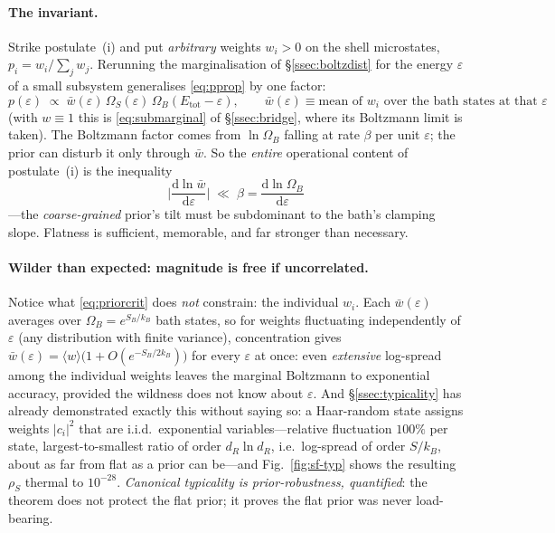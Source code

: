 \documentclass[11pt,a4paper]{article}
\theoremstyle{definition}
\newcommand{\dd}{\mathrm{d}}
\begin{document}
\paragraph{The invariant.} Strike postulate~(i) and put \emph{arbitrary}
weights $w_i>0$ on the shell microstates, $p_i=w_i/\sum_j w_j$. Rerunning the
marginalisation of \S\ref{ssec:boltzdist} for the energy $\varepsilon$ of a
small subsystem generalises \eqref{eq:pprop} by one factor:
\begin{equation}\label{eq:priorclass}
p(\varepsilon)\;\propto\;\bar w(\varepsilon)\,
\Omega_S(\varepsilon)\,\Omega_B(E_{\mathrm{tot}}-\varepsilon),
\qquad
\bar w(\varepsilon)\equiv
\text{mean of }w_i\text{ over the bath states at that }\varepsilon
\end{equation}
(with $w\equiv1$ this is \eqref{eq:submarginal} of \S\ref{ssec:bridge}, where
its Boltzmann limit is taken). The Boltzmann factor comes from
$\ln\Omega_B$ falling at rate $\beta$ per unit $\varepsilon$; the prior can
disturb it only through $\bar w$. So the \emph{entire} operational content of
postulate~(i) is the inequality
\begin{equation}\label{eq:priorcrit}
\boxed{\;\Big|\frac{\dd\ln\bar w}{\dd\varepsilon}\Big|\;\ll\;\beta
=\frac{\dd\ln\Omega_B}{\dd\varepsilon}\;}
\end{equation}
---the \emph{coarse-grained} prior's tilt must be subdominant to the bath's
clamping slope. Flatness is sufficient, memorable, and far stronger than
necessary.

\paragraph{Wilder than expected: magnitude is free if uncorrelated.} Notice
what \eqref{eq:priorcrit} does \emph{not} constrain: the individual $w_i$.
Each $\bar w(\varepsilon)$ averages over $\Omega_B=e^{S_B/k_B}$ bath states,
so for weights fluctuating independently of $\varepsilon$ (any distribution
with finite variance), concentration gives
$\bar w(\varepsilon)=\langle w\rangle\big(1+O(e^{-S_B/2k_B})\big)$ for every
$\varepsilon$ at once: even \emph{extensive} log-spread among the individual
weights leaves the marginal Boltzmann to exponential accuracy, provided the
wildness does not know about $\varepsilon$. And \S\ref{ssec:typicality} has
already demonstrated exactly this without saying so: a Haar-random state
assigns weights $|c_i|^2$ that are i.i.d.\ exponential variables---relative
fluctuation $100\%$ per state, largest-to-smallest ratio of order
$d_R\ln d_R$, i.e.\ log-spread of order $S/k_B$, about as far from flat as a
prior can be---and Fig.~\ref{fig:sf-typ} shows the resulting $\rho_S$ thermal
to $10^{-28}$. \emph{Canonical typicality is prior-robustness, quantified}:
the theorem does not protect the flat prior; it proves the flat prior was
never load-bearing.
\end{document}
